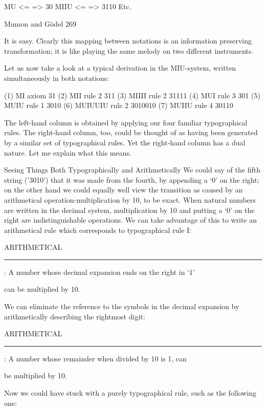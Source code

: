                                   MU <= => 30
                                  MIIU <= => 3110
                                     Etc.


Mumon and Gödel                                                                        269

It is easy. Clearly this mapping between notations is an information preserving
transformation; it is like playing the same melody on two different instruments.

       Let us now take a look at a typical derivation in the MIU-system, written
simultaneously in both notations:

(1)    MI             axiom 31
(2)    MII            rule 2 311
(3)    MIIII          rule 2 31111
(4)    MUI            rule 3 301
(5)    MUIU           rule 1 3010
(6)    MUIUUIU        rule 2 3010010
(7)    MUIIU          rule 4 30110

The left-hand column is obtained by applying our four familiar typographical rules. The
right-hand column, too, could be thought of as having been generated by a similar set of
typographical rules. Yet the right-hand column has a dual nature. Let me explain what
this means.

          Seeing Things Both Typographically and Arithmetically
We could say of the fifth string ('3010') that it was made from the fourth, by appending a
`0' on the right; on the other hand we could equally well view the transition as caused by
an arithmetical operation-multiplication by 10, to be exact. When natural numbers are
written in the decimal system, multiplication by 10 and putting a `0' on the right are
indistinguishable operations. We can take advantage of this to write an arithmetical rule
which corresponds to typographical rule I:

ARITHMETICAL \rule la: A number whose decimal expansion ends on the right in `1'\par

can be multiplied by 10.

We can eliminate the reference to the symbols in the decimal expansion by arithmetically
describing the rightmost digit:

ARITHMETICAL \rule Ib: A number whose remainder when divided by 10 is 1, can\par

be multiplied by 10.

Now we could have stuck with a purely typographical rule, such as the following one:

